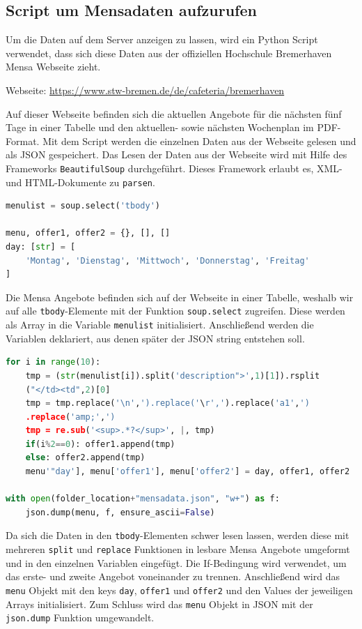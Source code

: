 \subsection{Script um Mensadaten aufzurufen}
\label{sec:pyMensa}

Um die Daten auf dem Server anzeigen zu lassen, wird ein Python Script verwendet, dass sich diese Daten aus der offiziellen Hochschule Bremerhaven Mensa Webseite zieht. 

Webseite: \url{https://www.stw-bremen.de/de/cafeteria/bremerhaven}

Auf dieser Webseite befinden sich die aktuellen Angebote für die nächsten fünf Tage in einer Tabelle und den aktuellen- sowie nächsten Wochenplan im PDF-Format. Mit dem Script werden die einzelnen Daten aus der Webseite gelesen und als JSON gespeichert. Das Lesen der Daten aus der Webseite wird mit Hilfe des Frameworks \verb|BeautifulSoup| durchgeführt. Dieses Framework erlaubt es, XML- und HTML-Dokumente zu \verb|parsen|.\\

\begin{lstlisting}[language=Python]
menulist = soup.select('tbody')

menu, offer1, offer2 = {}, [], []
day: [str] = [
    'Montag', 'Dienstag', 'Mittwoch', 'Donnerstag', 'Freitag'
]
\end{lstlisting}

Die Mensa Angebote befinden sich auf der Webseite in einer Tabelle, weshalb wir auf alle \verb|tbody|-Elemente mit der Funktion \verb|soup.select| zugreifen. Diese werden als Array in die Variable \verb|menulist| initialisiert. Anschließend werden die Variablen deklariert, aus denen später der JSON string entstehen soll. \\

\begin{lstlisting}[language=Python]
for i in range(10):
    tmp = (str(menulist[i]).split('description">',1)[1]).rsplit
    ("</td><td",2)[0]
    tmp = tmp.replace('\n',').replace('\r',').replace('a1',')
    .replace('amp;',')
    tmp = re.sub('<sup>.*?</sup>', |, tmp)
    if(i%2==0): offer1.append(tmp)
    else: offer2.append(tmp)
    menu'"day'], menu['offer1'], menu['offer2'] = day, offer1, offer2

with open(folder_location+"mensadata.json", "w+") as f:
    json.dump(menu, f, ensure_ascii=False)
\end{lstlisting}

Da sich die Daten in den \verb|tbody|-Elementen schwer lesen lassen, werden diese mit mehreren \verb|split| und \verb|replace| Funktionen in lesbare Mensa Angebote umgeformt und in den einzelnen Variablen eingefügt. Die If-Bedingung wird verwendet, um das erste- und zweite Angebot voneinander zu trennen. Anschließend wird das \verb|menu| Objekt mit den keys \verb|day|, \verb|offer1| und \verb|offer2| und den Values der jeweiligen Arrays initialisiert.
Zum Schluss wird das \verb|menu| Objekt in JSON mit der \verb|json.dump| Funktion umgewandelt.

